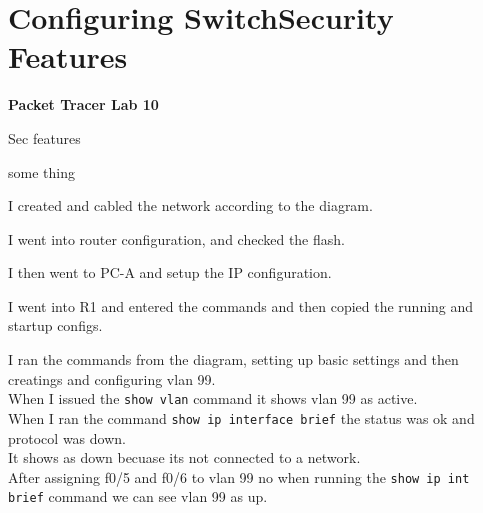\documentclass[../EngineeringJournal_CDavis.tex]{subfiles}
\begin{document}

\chapter[Configuring Switch Security]{Configuring Switch\linebreak[1] 
Security Features\hspace*{\fill February 26, 2020}}
\noindent\textbf{{Packet Tracer Lab 10} }                             


\hspace{0.2cm}
\begin{tcolorbox}[width=6.3in]
\scriptsize 
Sec features
  \begin{outline}
    \1  some thing
  \end{outline}
\end{tcolorbox}
\hspace{0.2cm}
\normalsize  
  

\clearpage


I created and cabled the network according to the diagram.


\noindent{}
I went into router configuration, and checked the flash.


\noindent{}
I then went to PC-A and setup the IP configuration.

\noindent{}
I went into R1 and entered the commands and then copied the running and
startup configs.


\noindent{}
I ran the commands from the diagram, setting up basic settings and then
creatings and configuring vlan 99. 
\\When I issued the {\scriptsize{\verb$show vlan$}\normalsize} command 
it shows vlan 99 as active.
\\ When I ran the command {\scriptsize{\verb$show ip interface brief$}\normalsize} 
the status was ok and protocol was down. 
\\It shows as down becuase its not connected to a network.
\\After assigning f0/5 and f0/6 to vlan 99 no when running
the {\scriptsize{\verb$show ip int brief$}\normalsize} command
we can see vlan 99 as up.
\end{document}

